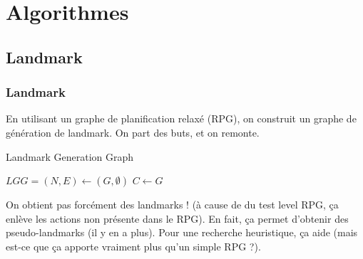 \section{Algorithmes}
  \subsection{Landmark}
\begin{frame}
  \frametitle{Landmark}

  \begin{block}{}
    En utilisant un graphe de planification relaxé (RPG), on construit un graphe de génération de landmark.
    On part des buts, et on remonte.
  \end{block}

  \begin{block}{}
    \begin{algorithm*}[H]
      \tiny
      \caption{ Landmark Generation Graph}
      
      
     
      $LGG = (N, E) \leftarrow (G, \emptyset)$\;
      $C \leftarrow G$\;
    \end{algorithm*}
  \end{block}
\end{frame}

\begin{frame}
  \begin{block}{}
    On obtient pas forcément des landmarks ! (à cause de du test level RPG, ça enlève les actions non présente dans le RPG).
    En fait, ça permet d'obtenir des pseudo-landmarks (il y en a plus). Pour une recherche heuristique, ça aide (mais est-ce que ça apporte vraiment plus qu'un simple RPG ?).
  \end{block}
\end{frame}

